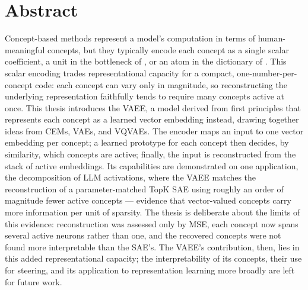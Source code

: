\begingroup
\let\clearpage\relax
\let\cleardoublepage\relax
\let\cleardoublepage\relax

\chapter*{Abstract}

Concept-based methods represent a model's computation in terms of
human-meaningful concepts, but they typically encode each concept as a single
scalar coefficient, \eg a unit in the bottleneck of , or an atom in
the dictionary of . This scalar encoding trades representational
capacity for a compact, one-number-per-concept code: each concept
can vary only in magnitude, so reconstructing the underlying representation
faithfully tends to require many concepts active at once. This thesis introduces
the \ac{VAEE}, a model derived from first principles that represents each
concept as a learned vector embedding instead, drawing together ideas from
\aclp{CEM}, \aclp{VAE}, and \aclp{VQVAE}. The encoder maps an input to one
vector embedding per concept; a learned prototype for each concept then decides,
by similarity, which concepts are active; finally, the input is reconstructed
from the stack of active embeddings. Its capabilities are demonstrated on one
application, the decomposition of \acl{LLM} activations, where the \ac{VAEE}
matches the reconstruction of a parameter-matched TopK \ac{SAE} using roughly an
order of magnitude fewer active concepts --- evidence that vector-valued
concepts carry more information per unit of sparsity. The thesis is deliberate
about the limits of this evidence: reconstruction was assessed only by
\acl{MSE}, each concept now spans several active neurons rather than one, and
the recovered concepts were not found more interpretable than the \ac{SAE}'s.
The \ac{VAEE}'s contribution, then, lies in this added representational
capacity; the interpretability of its concepts, their use for steering, and its
application to representation learning more broadly are left for future work.




\endgroup

\vfill
